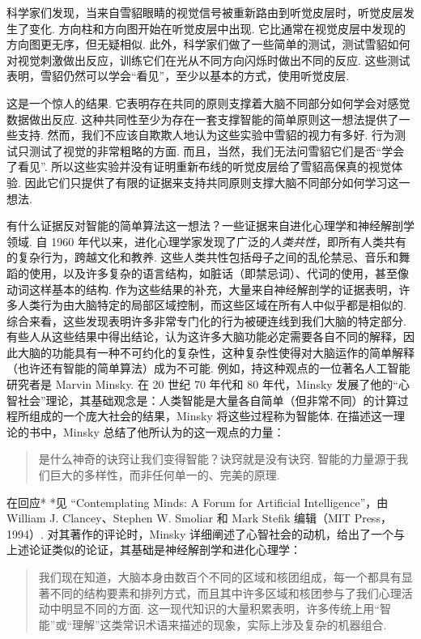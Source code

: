 科学家们发现，当来自雪貂眼睛的视觉信号被重新路由到听觉皮层时，听觉皮层发生了变化. 方向柱和方向图开始在听觉皮层中出现. 它比通常在视觉皮层中发现的方向图更无序，但无疑相似. 此外，科学家们做了一些简单的测试，测试雪貂如何对视觉刺激做出反应，训练它们在光从不同方向闪烁时做出不同的反应. 这些测试表明，雪貂仍然可以学会``看见''，至少以基本的方式，使用听觉皮层.

这是一个惊人的结果. 它表明存在共同的原则支撑着大脑不同部分如何学会对感觉数据做出反应. 这种共同性至少为存在一套支撑智能的简单原则这一想法提供了一些支持. 然而，我们不应该自欺欺人地认为这些实验中雪貂的视力有多好. 行为测试只测试了视觉的非常粗略的方面. 而且，当然，我们无法问雪貂它们是否``学会了看见''. 所以这些实验并没有证明重新布线的听觉皮层给了雪貂高保真的视觉体验. 因此它们只提供了有限的证据来支持共同原则支撑大脑不同部分如何学习这一想法.

有什么证据反对智能的简单算法这一想法？一些证据来自进化心理学和神经解剖学领域. 自 1960 年代以来，进化心理学家发现了广泛的\emph{人类共性}，即所有人类共有的复杂行为，跨越文化和教养. 这些人类共性包括母子之间的乱伦禁忌、音乐和舞蹈的使用，以及许多复杂的语言结构，如脏话（即禁忌词）、代词的使用，甚至像动词这样基本的结构. 作为这些结果的补充，大量来自神经解剖学的证据表明，许多人类行为由大脑特定的局部区域控制，而这些区域在所有人中似乎都是相似的. 综合来看，这些发现表明许多非常专门化的行为被硬连线到我们大脑的特定部分.
有些人从这些结果中得出结论，认为这许多大脑功能必定需要各自不同的解释，因此大脑的功能具有一种不可约化的复杂性，这种复杂性使得对大脑运作的简单解释（也许还有智能的简单算法）成为不可能. 例如，持这种观点的一位著名人工智能研究者是 Marvin Minsky. 在 20 世纪 70 年代和 80 年代，Minsky 发展了他的``心智社会''理论，其基础观念是：人类智能是大量各自简单（但非常不同）的计算过程所组成的一个庞大社会的结果，Minsky 将这些过程称为智能体. 在描述这一理论的书中，Minsky 总结了他所认为的这一观点的力量：

\begin{quote}
是什么神奇的诀窍让我们变得智能？诀窍就是没有诀窍. 智能的力量源于我们巨大的多样性，而非任何单一的、完美的原理.
\end{quote}

在回应* *见 ``Contemplating Minds: A Forum for Artificial Intelligence''，由 William J. Clancey、Stephen W. Smoliar 和 Mark Stefik 编辑（MIT Press，1994）. 对其著作的评论时，Minsky 详细阐述了心智社会的动机，给出了一个与上述论证类似的论证，其基础是神经解剖学和进化心理学：

\begin{quote}
我们现在知道，大脑本身由数百个不同的区域和核团组成，每一个都具有显著不同的结构要素和排列方式，而且其中许多区域和核团参与了我们心理活动中明显不同的方面. 这一现代知识的大量积累表明，许多传统上用``智能''或``理解''这类常识术语来描述的现象，实际上涉及复杂的机器组合.
\end{quote}

